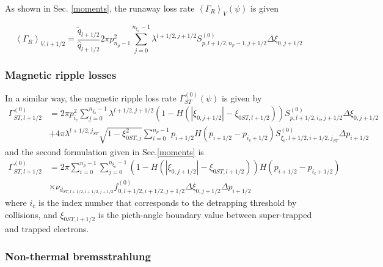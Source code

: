 As shown in Sec. \ref{moments}, the runaway loss rate $\left\langle \Gamma
_{R}\right\rangle _{V}\left(  \psi\right)  $ is given%

\begin{equation}
\left\langle \Gamma_{R}\right\rangle _{V,l+1/2}=\frac{\widetilde{q}_{l+1/2}%
}{\widehat{q}_{l+1/2}}2\pi p_{n_{p}-1}^{2}\sum_{j=0}^{n_{\xi_{0}}-1}%
\lambda^{l+1/2,j+1/2}S_{p,l+1/2,n_{p}-1,j+1/2}^{\left(  0\right)  }\Delta
\xi_{0,j+1/2}%
\end{equation}

\subsubsection{Magnetic ripple losses}

In a similar way, the magnetic ripple loss rate $\Gamma_{ST}^{\left(
0\right)  }\left(  \psi\right)  $ is given by
\begin{align}
\Gamma_{ST,l+1/2}^{\left(  0\right)  }  &  =2\pi p_{i_{c}}^{2}\sum
_{j=0}^{n_{\xi_{0}}-1}\lambda^{l+1/2,j+1/2}\left(  1-H\left(  \left|
\xi_{0,j+1/2}\right|  -\xi_{0ST,l+1/2}\right)  \right)  S_{p,l+1/2,i_{c}%
,j+1/2}^{\left(  0\right)  }\Delta\xi_{0,j+1/2}\nonumber\\
&  +4\pi\lambda^{l+1/2,j_{ST}}\sqrt{1-\xi_{0ST,j}^{2}}\sum_{i=0}^{n_{p}%
-1}p_{i+1/2}H\left(  p_{i+1/2}-p_{i_{c}+1/2}\right)  S_{\xi_{0}%
,l+1/2,i+1/2,j_{ST}}^{\left(  0\right)  }\Delta p_{i+1/2}%
\end{align}
and the second formulation given in Sec.\ref{moments} is
\begin{align}
\Gamma_{ST,l+1/2}^{\left(  0\right)  }  &  =2\pi\sum_{i=0}^{n_{p}-1}\sum
_{j=0}^{n_{\xi_{0}}-1}\left(  1-H\left(  \left|  \xi_{0,j+1/2}\right|
-\xi_{0ST,l+1/2}\right)  \right)  H\left(  p_{i+1/2}-p_{i_{c}+1/2}\right)
\nonumber\\
&  \times\nu_{d_{ST,l+1/2,i+1/2,j+1/2}}f_{0,l+1/2,i+1/2,j+1/2}^{(0)}\Delta
\xi_{0,j+1/2}\Delta p_{i+1/2}%
\end{align}
where $i_{c}$ is the index number that corresponds to the detrapping threshold
by collisions, and $\xi_{0ST,l+1/2}$ is the picth-angle boundary value between
super-trapped and trapped electrons.

\subsubsection{Non-thermal bremsstrahlung}

